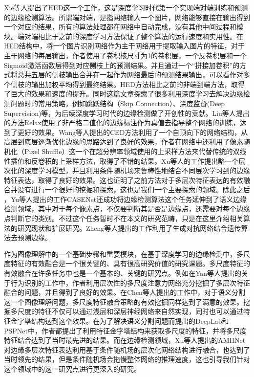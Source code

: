 \documentclass[master]{thesis-uestc}
\begin{document}
Xie等人提出了HED这一个工作，这是深度学习时代第一个实现端对端训练和预测的边缘检测算法。所谓端对端，是指网络输入一个图片，网络能够直接在输出得到一个对应的结果，所有的算法处理都在网络中自动完成，没有其他中间过程和模块。端对端相比于之前的深度学习方法保证了整个算法的运行速度和实用性。在HED结构中，将一个图片识别网络作为主干网络用于提取输入图片的特征，对于主干网络的每层输出，作者使用了卷积核尺寸为1的卷积层，一个反卷积层和一个Sigmoid激活函数层得到对应侧枝上的预测结果。并且通过一个“拼接加卷积”的方式将总共五层的侧枝输出合并在一起作为网络最后的预测结果输出，可以看作对多个侧枝的输出加权平均得到最终结果。HED方法相比之前的非端到端方法，取得了巨大的效果和速度的提升。同时这篇文章探索了很多利用深度学习去解决边缘检测问题时的常用策略，例如跳跃结构（Skip Connection）、深度监督(Deep Supervision)等，为后续深度学习时代的边缘检测做了开创性的贡献。Liu等人提出的方法Relax使用了非严格二值化的边缘标注作为真值去指导整个网络的训练，达到了更好的效果。Wang等人提出的CED方法利用了一个自顶向下的网络结构，从高层到底层逐渐优化边缘的思路达到了良好的效果，作者在网络中还利用了像素随机化（Pixel Shuffle）这一个在超分辨率领域使用的上采样方法来代替传统的双线性插值和反卷积的上采样方法，取得了不错的结果。Xu等人的工作提出略一个层次化的深度学习模型，并且利用条件随机场来鲁棒性地结合不同层次学习到的边缘特征表达，取得了良好的效果。这也证明了之前方法对于多层次特征表达的有效融合并没有进行一个很好的挖掘和探索，这也是我们一个主要探索的领域。除此之后 ，Yu等人提出的工作CASENet还成功将边缘检测算法这个任务延伸到了语义边缘检测领域，其中对于每个像素点，不仅要判断其是否是边缘点，还需要对每个边缘点判断它的类别。不过这个任务暂时不在本文的研究范畴，只是在这里介绍相关算法的研究现状和扩展研究。Zheng等人提出的工作利用了生成对抗网络结合遗传算法去预测边缘。

作为图像理解中的一个基础步骤和重要模块，在基于深度学习的边缘检测中，多尺度特征的有效融合是一个很关键的、具有很高研究价值的研究课题。多尺度特征的有效融合在许多任务中也是一个基本的、关键的研究点。例如在Yan等人提出的关于行为识别的工作中，作者利用层次性的多尺度注意力网络充分挖掘了多层次特征融合的问题，并且得到了良好的效果。在Chen等人提出的工作中，对于语义分割这一个图像理解问题，多尺度特征融合策略的有效挖掘同样达到了满意的效果。挖掘多尺度的特征不仅可以通过浅层和深层神经网络来自然实现，同时也可以通过特征金字塔结构达到这个效果。在为了解决语义分割问题而提出的DeepLab和PSPNet中，作者都提出了利用特征金字塔结构来获取多尺度的特征，并将多尺度特征结合达到了当时最先进的结果。而在边缘检测领域，Xu等人提出的AMHNet对边缘多层次特征表达利用基于条件随机场的层次化网络结构进行融合，也达到了当时领先的结果，但是条件随机场会拖慢整体网络的推理速度，这也引导我们针对这个领域中的这一研究点进行更深入的研究。
\end{document}
